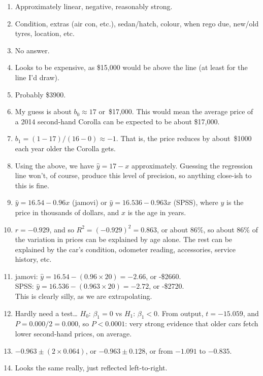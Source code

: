 \documentclass[
  11pt,
  a4paper,
  krantz2]{krantz}
\providecommand{\tightlist}{%
  \setlength{\itemsep}{0pt}\setlength{\parskip}{0pt}}
\begin{document}
\begin{footnotesize}
\begin{enumerate}
\def\labelenumi{\arabic{enumi}.}
\tightlist
\item
  Approximately linear, negative, reasonably strong.
\item
  Condition, extras (air con, etc.), sedan/hatch, colour, when rego due, new/old tyres, location, etc.
\item
  No answer.
\item
  Looks to be expensive, as \$15,000 would be above the line (at least for the line I'd draw).
\item
  Probably \$3900.
\item
  My guess is about \(b_0\approx 17\) or~\$17,000.
  This would mean the average price of a 2014 second-hand Corolla can be expected to be about \$17,000.
\item
  \(b_1 = (1 - 17)/(16 - 0)\approx -1\).
  That is, the price reduces by about~\$1000 each year older the Corolla gets.
\item
  Using the above, we have \(\hat{y} = 17 - x\) approximately.
  Guessing the regression line won't, of course, produce this level of precision, so anything close-ish to this is fine.
\item
  \(\hat{y} = 16.54 - 0.96x\) (jamovi) or \(\hat{y} = 16.536 - 0.963x\) (SPSS), where \(y\) is the price in thousands of dollars, and \(x\) is the age in years.
\item
  \(r = -0.929\), and so \(R^2 = (-0.929)^2 = 0.863\), or about \(86\)\%, so about \(86\)\% of the variation in prices can be explained by age alone.
  The rest can be explained by the car's condition, odometer reading, accessories, service history, etc.
\item
  jamovi: \(\hat{y} = 16.54 - (0.96\times 20) = -2.66\), or -\$2660.\\
  SPSS: \(\hat{y} = 16.536 - (0.963\times 20) = -2.72\), or -\$2720.\\
  This is clearly silly, as we are extrapolating.
\item
  Hardly need a test\ldots{} \(H_0\): \(\beta_1 = 0\) vs \(H_1\): \(\beta_1 < 0\).
  From output, \(t = -15.059\), and \(P = 0.000/2 = 0.000\), so \(P < 0.0001\): very strong evidence that older cars fetch lower second-hand prices, on average.
\item
  \(-0.963 \pm (2\times 0.064)\), or \(-0.963\pm 0.128\), or from \(-1.091\) to \(-0.835\).
\item
  Looks the same really, just reflected left-to-right.


\end{enumerate}
\end{footnotesize}
\end{document}
